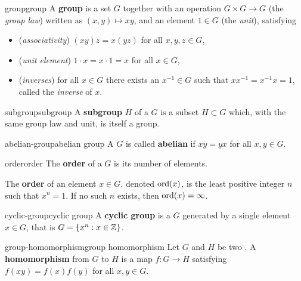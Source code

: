 \begin{topic}{group}{group}
    A \textbf{group} is a set $G$ together with an operation $G \times G \to G$ (the \textit{group law}) written as $(x, y) \mapsto xy$, and an element $1 \in G$ (the \textit{unit}), satisfying
    \begin{itemize}
        \item (\textit{associativity}) $(xy)z = x(yz)$ for all $x, y, z \in G$,
        \item (\textit{unit element}) $1 \cdot x = x \cdot 1 = x$ for all $x \in G$,
        \item (\textit{inverses}) for all $x \in G$ there exists an $x^{-1} \in G$ such that $x x^{-1} = x^{-1} x = 1$, called the \textit{inverse} of $x$.
    \end{itemize}
\end{topic}

\begin{topic}{subgroup}{subgroup}
    A \textbf{subgroup} $H$ of a  $G$ is a subset $H \subset G$ which, with the same group law and unit, is itself a group.
\end{topic}

\begin{topic}{abelian-group}{abelian group}
    A  $G$ is called \textbf{abelian} if $xy = yx$ for all $x, y \in G$.
\end{topic}

\begin{topic}{order}{order}
    The \textbf{order} of a  $G$ is its number of elements.
    
    The \textbf{order} of an element $x \in G$, denoted $\textup{ord}(x)$, is the least positive integer $n$ such that $x^n = 1$. If no such $n$ exists, then $\textup{ord}(x) = \infty$.
\end{topic}

\begin{topic}{cyclic-group}{cyclic group}
    A \textbf{cyclic group} is a  $G$ generated by a single element $x \in G$, that is $G = \{ x^n : x \in \mathbb{Z} \}$.
\end{topic}

\begin{topic}{group-homomorphism}{group homomorphism}
    Let $G$ and $H$ be two . A \textbf{homomorphism} from $G$ to $H$ is a map $f : G \to H$ satisfying $f(xy) = f(x) f(y)$ for all $x, y \in G$.
\end{topic}

